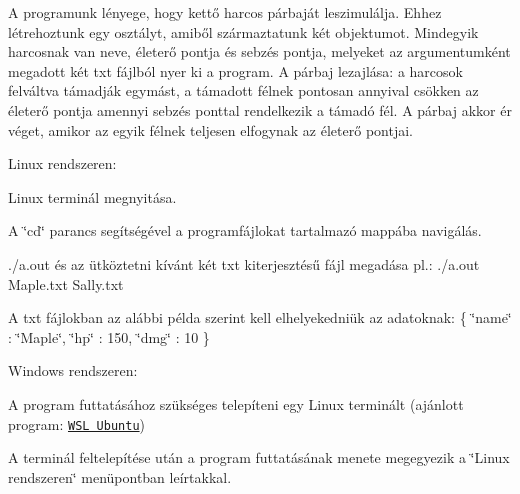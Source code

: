 A programunk lényege, hogy kettő harcos párbaját leszimulálja. Ehhez létrehoztunk egy osztályt, amiből származtatunk két objektumot. Mindegyik harcosnak van neve, életerő pontja és sebzés pontja, melyeket az argumentumként megadott két txt fájlból nyer ki a program. A párbaj lezajlása\+: a harcosok felváltva támadják egymást, a támadott félnek pontosan annyival csökken az életerő pontja amennyi sebzés ponttal rendelkezik a támadó fél. A párbaj akkor ér véget, amikor az egyik félnek teljesen elfogynak az életerő pontjai.


\begin{DoxyItemize}
\item Linux rendszeren\+:
\begin{DoxyItemize}
\item Linux terminál megnyitása.
\item A \char`\"{}cd\char`\"{} parancs segítségével a programfájlokat tartalmazó mappába navigálás.
\item ./a.out és az ütköztetni kívánt két txt kiterjesztésű fájl megadása pl.\+: ./a.out Maple.\+txt Sally.\+txt
\item A txt fájlokban az alábbi példa szerint kell elhelyekedniük az adatoknak\+: \{ \char`\"{}name\char`\"{} \+: \char`\"{}\+Maple\char`\"{}, \char`\"{}hp\char`\"{} \+: 150, \char`\"{}dmg\char`\"{} \+: 10 \}
\end{DoxyItemize}
\item Windows rendszeren\+:
\begin{DoxyItemize}
\item A program futtatásához szükséges telepíteni egy Linux terminált (ajánlott program\+: \href{https://ubuntu.com/wsl}{\tt W\+SL Ubuntu})
\item A terminál feltelepítése után a program futtatásának menete megegyezik a \char`\"{}\+Linux rendszeren\char`\"{} menüpontban leírtakkal. 
\end{DoxyItemize}
\end{DoxyItemize}